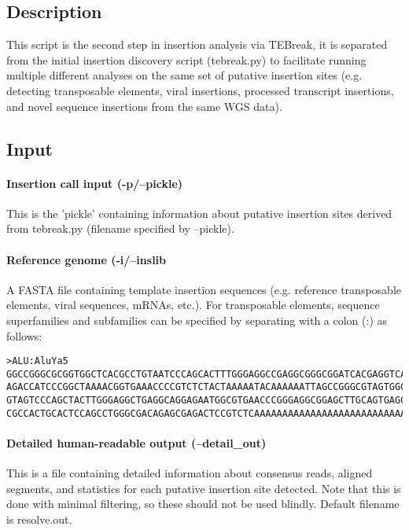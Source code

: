 \documentclass[letterpaper,11pt]{article}
\begin{document}
\subsection{Description}
This script is the second step in insertion analysis via TEBreak, it is separated from the initial insertion discovery script (tebreak.py) to facilitate running multiple different analyses on the same set of putative insertion sites (e.g. detecting transposable elements, viral insertions, processed transcript insertions, and novel sequence insertions from the same WGS data).

\subsection{Input}
\paragraph{Insertion call input (-p/--pickle)}
	This is the 'pickle' containing information about putative insertion sites derived from tebreak.py (filename specified by --pickle).
	
\paragraph{Reference genome (-i/--inslib}
A FASTA file containing template insertion sequences (e.g. reference transposable elements, viral sequences, mRNAs, etc.). For transposable elements, sequence superfamilies and subfamilies can be specified by separating with a colon (:) as follows:

\begin{verbatim}
>ALU:AluYa5
GGCCGGGCGCGGTGGCTCACGCCTGTAATCCCAGCACTTTGGGAGGCCGAGGCGGGCGGATCACGAGGTCAGGAGATCG
AGACCATCCCGGCTAAAACGGTGAAACCCCGTCTCTACTAAAAATACAAAAAATTAGCCGGGCGTAGTGGCGGGCGCCT
GTAGTCCCAGCTACTTGGGAGGCTGAGGCAGGAGAATGGCGTGAACCCGGGAGGCGGAGCTTGCAGTGAGCCGAGATCC
CGCCACTGCACTCCAGCCTGGGCGACAGAGCGAGACTCCGTCTCAAAAAAAAAAAAAAAAAAAAAAAAAAAAAAAAAAA
\end{verbatim}

\paragraph{Detailed human-readable output (--detail\_out)}
This is a file containing detailed information about consensus reads, aligned segments, and statistics for each putative insertion site detected. Note that this is done with minimal filtering, so these should not be used blindly. Default filename is resolve.out.
\end{document}

